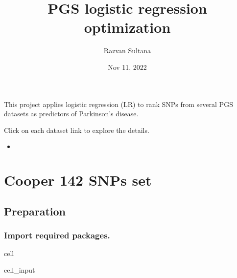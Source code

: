 \documentclass[letterpaper,10pt,english]{jupyterBook}
\title{PGS logistic regression optimization}
\date{Nov 11, 2022}
\author{Razvan Sultana}
\begin{document}
\pagestyle{empty}
\sphinxmaketitle
\pagestyle{plain}
\sphinxtableofcontents
\pagestyle{normal}
\label{\detokenize{intro::doc}}


\sphinxAtStartPar
This project applies logistic regression (LR) to rank SNPs from several PGS datasets as predictors of Parkinson’s disease.

\sphinxAtStartPar
Click on each dataset link to explore the details.
\begin{itemize}
\item {} 
\sphinxAtStartPar
{\hyperref[\detokenize{Cooper::doc}]{}}

\end{itemize}

\sphinxstepscope


\chapter{Cooper 142 SNPs set}
\label{\detokenize{Cooper:cooper-142-snps-set}}\label{\detokenize{Cooper::doc}}

\section{Preparation}
\label{\detokenize{Cooper:preparation}}

\subsection{Import required packages.}
\label{\detokenize{Cooper:import-required-packages}}
\begin{sphinxuseclass}{cell}\begin{sphinxVerbatimInput}

\begin{sphinxuseclass}{cell_input}
\begin{sphinxVerbatim}[commandchars=\\\{\}]
   
   
   
   
   
   
   
\end{sphinxVerbatim}

\end{sphinxuseclass}\end{sphinxVerbatimInput}

\end{sphinxuseclass}
\end{document}
